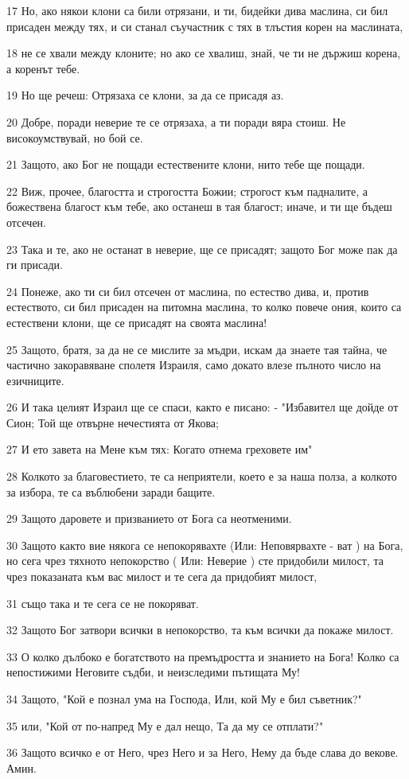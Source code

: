 \par 17 Но, ако някои клони са били отрязани, и ти, бидейки дива маслина, си бил присаден между тях, и си станал съучастник с тях в тлъстия корен на маслината,
\par 18 не се хвали между клоните; но ако се хвалиш, знай, че ти не държиш корена, а коренът тебе.
\par 19 Но ще речеш: Отрязаха се клони, за да се присадя аз.
\par 20 Добре, поради неверие те се отрязаха, а ти поради вяра стоиш. Не високоумствувай, но бой се.
\par 21 Защото, ако Бог не пощади естествените клони, нито тебе ще пощади.
\par 22 Виж, прочее, благостта и строгостта Божии; строгост към падналите, а божествена благост към тебе, ако останеш в тая благост; иначе, и ти ще бъдеш отсечен.
\par 23 Така и те, ако не останат в неверие, ще се присадят; защото Бог може пак да ги присади.
\par 24 Понеже, ако ти си бил отсечен от маслина, по естество дива, и, против естеството, си бил присаден на питомна маслина, то колко повече ония, които са естествени клони, ще се присадят на своята маслина!
\par 25 Защото, братя, за да не се мислите за мъдри, искам да знаете тая тайна, че частично закоравяване сполетя Израиля, само докато влезе пълното число на езичниците.
\par 26 И така целият Израил ще се спаси, както е писано: - "Избавител ще дойде от Сион; Той ще отвърне нечестията от Якова;
\par 27 И ето завета на Мене към тях: Когато отнема греховете им"
\par 28 Колкото за благовестието, те са неприятели, което е за наша полза, а колкото за избора, те са въблюбени заради бащите.
\par 29 Защото даровете и призванието от Бога са неотменими.
\par 30 Защото както вие някога се непокорявахте (Или: Неповярвахте - ват ) на Бога, но сега чрез тяхното непокорство ( Или: Неверие ) сте придобили милост, та чрез показаната към вас милост и те сега да придобият милост,
\par 31 също така и те сега се не покоряват.
\par 32 Защото Бог затвори всички в непокорство, та към всички да покаже милост.
\par 33 О колко дълбоко е богатството на премъдростта и знанието на Бога! Колко са непостижими Неговите съдби, и неизследими пътищата Му!
\par 34 Защото, "Кой е познал ума на Господа, Или, кой Му е бил съветник?"
\par 35 или, "Кой от по-напред Му е дал нещо, Та да му се отплати?"
\par 36 Защото всичко е от Него, чрез Него и за Него, Нему да бъде слава до векове. Амин.

